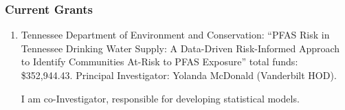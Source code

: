 %
%
\iffalse
\else
\subsubsection{Current Grants}
\begin{enumerate}
	\item Tennessee Department of Environment and Conservation:
	``PFAS Risk in Tennessee Drinking Water Supply: A Data-Driven Risk-Informed Approach to Identify Communities At-Risk to PFAS Exposure''
	total funds: \$352,944.43.
	Principal Investigator: Yolanda McDonald (Vanderbilt HOD). 
	\begin{credit}
		I am co-Investigator, responsible for developing statistical models.
	\end{credit}
%
%
\end{enumerate}
\fi
%
\iffalse
\subsubsection{Pending Grant Proposals}
\fi
%
